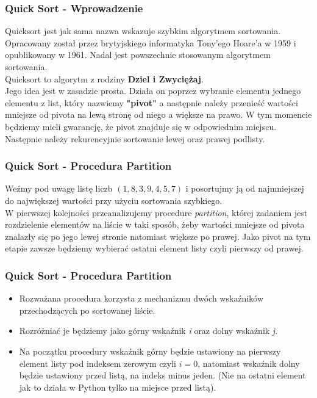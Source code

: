 \documentclass[kslide.tex]{subfiles}
\begin{document}
\begin{frame}
\frametitle{Quick Sort - Wprowadzenie}

Quicksort jest jak sama nazwa wskazuje szybkim algorytmem sortowania. Opracowany został przez brytyjskiego informatyka Tony'ego Hoare'a w 1959 i opublikowany w 1961. Nadal jest powszechnie stosowanym algorytmem sortowania.\\[0.3cm]\pause
Quicksort to algorytm z rodziny \textbf{Dziel i Zwyciężaj}.\\[0.3cm]\pause
Jego idea jest w zasadzie prosta. Działa on poprzez wybranie elementu jednego elementu z list, który nazwiemy \textbf{"pivot"} a następnie należy przenieść wartości mniejsze od pivota na lewą stronę od niego a większe na prawo. W tym momencie będziemy mieli gwarancję, że pivot znajduje się w odpowiednim miejscu. Następnie należy rekurencyjnie sortowanie lewej oraz prawej podlisty.
\end{frame}

\begin{frame}
\frametitle{Quick Sort - Procedura Partition}
    Weźmy pod uwagę listę liczb $(1, 8, 3, 9, 4, 5, 7)$ i posortujmy ją od najmniejszej do największej wartości przy użyciu sortowania szybkiego.\\[0.3cm]\pausev 
    W pierwszej kolejności przeanalizujemy procedure \textit{partition}, której zadaniem jest rozdzielenie elementów na liście w taki sposób, żeby wartości mniejsze od pivota znalazły się po jego lewej stronie natomiast większe po prawej. Jako pivot na tym etapie zawsze będziemy wybierać ostatni element listy czyli pierwszy od prawej.\\[0.3cm]
\end{frame}

\begin{frame}
\frametitle{Quick Sort - Procedura Partition}
\begin{itemize}
    \item<1-> Rozważana procedura korzysta z mechanizmu dwóch wskaźników przechodzących po sortowanej liście.
    \item<2-> Rozróżniać je będziemy jako górny wskaźnik \textit{i} oraz dolny wskaźnik \textit{j}.
    \item<3-> Na początku procedury wskaźnik górny będzie ustawiony na pierwszy element listy pod indeksem zerowym czyli $i = 0$, natomiast wskaźnik dolny będzie ustawiony przed listą, na indeks minus jeden. (Nie na ostatni element jak to działa w Python tylko na miejsce przed listą).
    
    \end{itemize} 
\end{frame}
\end{document}
